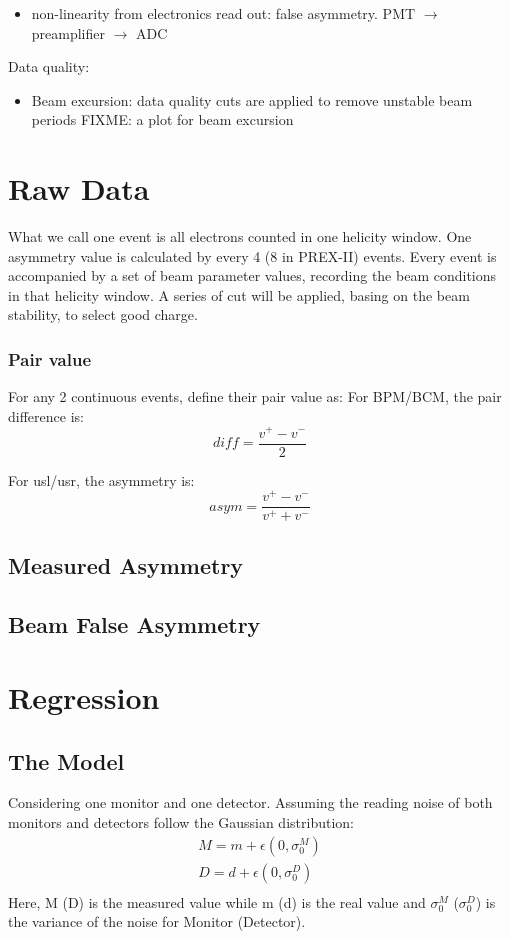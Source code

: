 \begin{itemize}
    \item non-linearity from electronics read out: false asymmetry. PMT $\rightarrow$
	preamplifier $\rightarrow$ ADC
\end{itemize}

Data quality:
\begin{itemize}
    \item Beam excursion: data quality cuts are applied to remove unstable beam periods
	FIXME: a plot for beam excursion
\end{itemize}

\section{Raw Data}
What we call one event is all electrons counted in one helicity window.
One asymmetry value is calculated by every 4 (8 in PREX-II) events. Every event
is accompanied by a set of beam parameter values, recording the beam conditions
in that helicity window. A series of cut will be applied, basing on the beam
stability, to select good charge.

\subsubsection{Pair value}
For any 2 continuous events, define their pair value as:
For BPM/BCM, the pair difference is:
$$ diff = \frac{v^+ - v^-}{2} $$

For usl/usr, the asymmetry is:
$$ asym = \frac{v^+ - v^-}{v^+ + v^-} $$

\subsection{Measured Asymmetry}
\subsection{Beam False Asymmetry}

\section{Regression}
\subsection{The Model}
Considering one monitor and one detector. Assuming the reading noise of both 
monitors and detectors follow the Gaussian distribution:
\begin{equation*}
    \begin{gathered}
	M = m + \epsilon(0, \sigma_0^M)    \\
	D = d + \epsilon(0, \sigma_0^D)    \\
    \end{gathered}
\end{equation*}
Here, M (D) is the measured value while m (d) is the real value and
$\sigma_0^M$ ($\sigma_0^D$) is the variance of the noise for Monitor (Detector).


